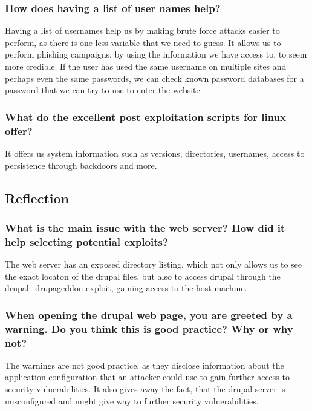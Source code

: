 \subsubsection{How does having a list of user names help?}
Having a list of usernames help us by making brute force attacks easier to perform, as there is one less variable that we need to guess. It allows us to perform phishing campaigns, by using the information we have access to, to seem more credible. If the user has used the same username on multiple sites and perhaps even the same passwords, we can check known password databases for a password that we can try to use to enter the website.

\subsubsection{What do the excellent post exploitation scripts for linux offer?}
It offers us system information such as versions, directories, usernames, access to persistence through backdoors and more.

\subsection{Reflection}

\subsubsection{What is the main issue with the web server? How did it help selecting potential exploits?}
The web server has an exposed directory listing, which not only allows us to see the exact locaton of the drupal files, but also to access drupal through the drupal\_drupageddon exploit, gaining access to the host machine.

\subsubsection{When opening the drupal web page, you are greeted by a warning. Do you think this is good practice? Why or why not?}
The warnings are not good practice, as they disclose information about the application configuration that an attacker could use to gain further access to security vulnerabilities. It also gives away the fact, that the drupal server is misconfigured and might give way to further security vulnerabilities.

